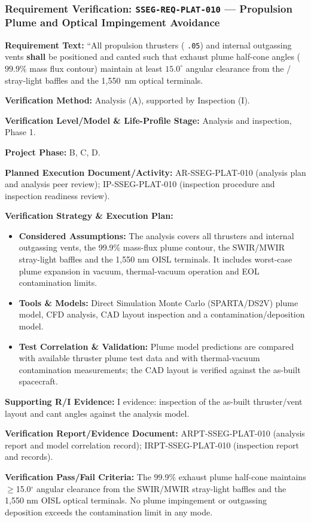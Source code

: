 \subsubsection{Requirement Verification: \texttt{SSEG-REQ-PLAT-010} --- Propulsion Plume and Optical Impingement Avoidance}
\label{ver:SSEG-REQ-PLAT-010}
\textbf{Requirement Text:} ``All propulsion thrusters ( \texttt{.05}) and internal outgassing vents \textbf{shall} be positioned and canted such that exhaust plume half-cone angles ($99.9\%$ mass flux contour) maintain at least $15.0^\circ$ angular clearance from the / stray-light baffles and the 1,550~nm  optical terminals.
\par\textbf{Verification Method:} Analysis (A), supported by Inspection (I).
\par\textbf{Verification Level/Model \& Life-Profile Stage:} Analysis and inspection, Phase 1.
\par\textbf{Project Phase:} B, C, D.
\par\textbf{Planned Execution Document/Activity:} AR-SSEG-PLAT-010 (analysis plan and analysis peer review); IP-SSEG-PLAT-010 (inspection procedure and inspection readiness review).
\par\textbf{Verification Strategy \& Execution Plan:}
\begin{itemize}
\item \textbf{Considered Assumptions:} The analysis covers all thrusters and internal outgassing vents, the 99.9\% mass-flux plume contour, the SWIR/MWIR stray-light baffles and the 1,550 nm OISL terminals. It includes worst-case plume expansion in vacuum, thermal-vacuum operation and EOL contamination limits.
\item \textbf{Tools \& Models:} Direct Simulation Monte Carlo (SPARTA/DS2V) plume model, CFD analysis, CAD layout inspection and a contamination/deposition model.
\item \textbf{Test Correlation \& Validation:} Plume model predictions are compared with available thruster plume test data and with thermal-vacuum contamination measurements; the CAD layout is verified against the as-built spacecraft.
\end{itemize}
\par\textbf{Supporting R/I Evidence:} I evidence: inspection of the as-built thruster/vent layout and cant angles against the analysis model.
\par\textbf{Verification Report/Evidence Document:} ARPT-SSEG-PLAT-010 (analysis report and model correlation record); IRPT-SSEG-PLAT-010 (inspection report and records).
\par\textbf{Verification Pass/Fail Criteria:} The 99.9\% exhaust plume half-cone maintains $\ge$15.0$^\circ$ angular clearance from the SWIR/MWIR stray-light baffles and the 1,550 nm OISL optical terminals. No plume impingement or outgassing deposition exceeds the contamination limit in any mode.
\par\medskip
